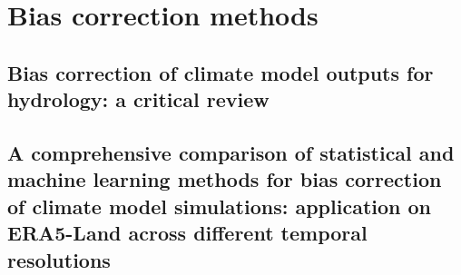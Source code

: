 \chapter{Bias correction methods}

\ifpdf
    \graphicspath{{Chapter4/Figs/Raster/}{Chapter4/Figs/PDF/}{Chapter4/Figs/}}
\else
    \graphicspath{{Chapter4/Figs/Vector/}{Chapter4/Figs/}}
\fi

\section{Bias correction of climate model outputs for hydrology: a critical review\label{section4.1}}

\section{A comprehensive comparison of statistical and machine
learning methods for bias correction of climate model
simulations: application on ERA5-Land across different
temporal resolutions\label{section4.2}}